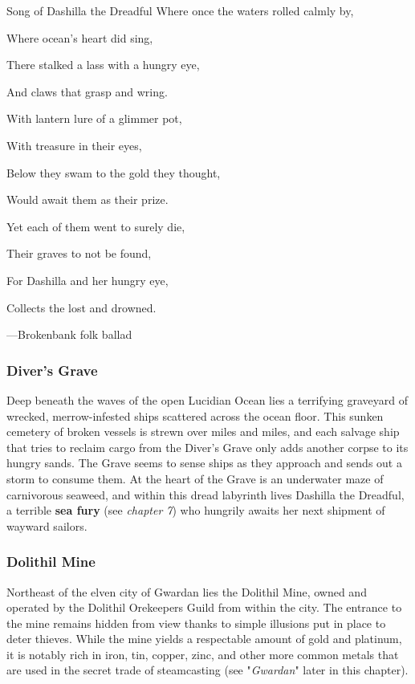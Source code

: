 \documentclass[10pt,a4paper,twoside,bg=print,twocolumn,openany,nodeprecatedcode]{dndbook}
\begin{document}
\begin{DndReadAloud}{Song of Dashilla the Dreadful}
Where once the waters rolled calmly by,

Where ocean's heart did sing,

There stalked a lass with a hungry eye,

And claws that grasp and wring.

With lantern lure of a glimmer pot,

With treasure in their eyes,

Below they swam to the gold they thought,

Would await them as their prize.

Yet each of them went to surely die,

Their graves to not be found,

For Dashilla and her hungry eye,

Collects the lost and drowned.

—Brokenbank folk ballad

\end{DndReadAloud}

\subsubsection{Diver's Grave}
Deep beneath the waves of the open Lucidian Ocean lies a terrifying graveyard of wrecked, merrow-infested ships scattered across the ocean floor. This sunken cemetery of broken vessels is strewn over miles and miles, and each salvage ship that tries to reclaim cargo from the Diver's Grave only adds another corpse to its hungry sands. The Grave seems to sense ships as they approach and sends out a storm to consume them. At the heart of the Grave is an underwater maze of carnivorous seaweed, and within this dread labyrinth lives Dashilla the Dreadful, a terrible \textbf{sea fury} (see \textit{chapter 7}) who hungrily awaits her next shipment of wayward sailors.

\subsubsection{Dolithil Mine}
Northeast of the elven city of Gwardan lies the Dolithil Mine, owned and operated by the Dolithil Orekeepers Guild from within the city. The entrance to the mine remains hidden from view thanks to simple illusions put in place to deter thieves. While the mine yields a respectable amount of gold and platinum, it is notably rich in iron, tin, copper, zinc, and other more common metals that are used in the secret trade of steamcasting (see "\textit{Gwardan}" later in this chapter).
\end{document}
